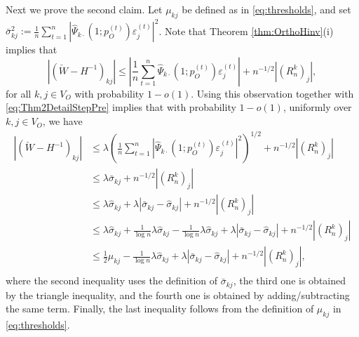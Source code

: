 \documentclass[opre,nonblindrev]{informs3} %
\begin{document}
\begin{APPENDIX}{}
Next we prove the second claim. 
Let $\mu_{kj}$ be defined as in \eqref{eq:thresholds},
and set $\bar \sigma_{kj}^2 := \frac{1}{n} \sum_{t=1}^n |\hat\Psi_{k\cdot}(1;p_O^{(t)}) \varepsilon_j^{(t)}|^2$.
Note that Theorem \ref{thm:OrthoHinv}(i) implies that
$$ 
|(\check W - H^{-1})_{kj}| 	 \leq  \left|\frac{1}{n} \sum_{t=1}^n \hat\Psi_{k\cdot}(1;p_O^{(t)}) \varepsilon_j^{(t)}\right| + n^{-1/2}|(R^k_{n})_j|,
$$
for all $k,j\in V_O$ with probability $1-o(1)$. 
Using this observation together with  \eqref{eq:Thm2DetailStepPre} implies that
with probability $1-o(1)$,  uniformly over $k,j \in   V_O$, we have
\begin{equation}\label{eq:AddSubSigmakj}
\begin{array}{rl}
|(\check W - H^{-1})_{kj}| &
 \leq  \lambda \left( \frac{1}{n} \sum_{t=1}^n |\hat\Psi_{k\cdot}(1;p_O^{(t)}) \varepsilon_j^{(t)}|^2\right)^{1/2} +n^{-1/2}|(R^k_{n})_j|\\
 & \leq  \lambda \bar\sigma_{kj} +  n^{-1/2}|(R^k_{n})_j| \\
 & \leq  \lambda \hat\sigma_{kj} + \lambda|\bar\sigma_{kj}-\hat\sigma_{kj}| + n^{-1/2}|(R^k_{n})_j| \\
 & \leq   \lambda \hat\sigma_{kj}
 +\frac{1}{\log n} \lambda \hat\sigma_{kj}
 -\frac{1}{\log n} \lambda \hat\sigma_{kj}
 +  \lambda|\bar\sigma_{kj}-\hat\sigma_{kj}| + n^{-1/2}|(R^k_{n})_j| \\
 & \leq  \frac{1}{2}\mu_{kj} - \frac{1}{\log n} \lambda \hat\sigma_{kj}+ 
\lambda|\bar\sigma_{kj}-\hat\sigma_{kj}| + n^{-1/2}|(R^k_{n})_j|, \\
\end{array}
\end{equation}
where the second inequality uses the definition of $\bar{ \sigma}_{kj}$, the third one is obtained by the triangle inequality, and
the fourth one is obtained by adding/subtracting the same term. Finally,
the
last inequality follows from
the definition of 
$\mu_{kj}$ in \eqref{eq:thresholds}.


\end{APPENDIX}
\end{document}
